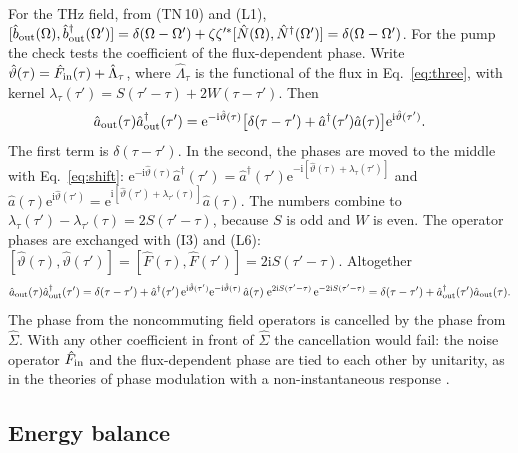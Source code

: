 \documentclass[aps,pra,onecolumn,notitlepage,11pt,amsmath,amssymb,nofootinbib]{revtex4-2}
\newcommand{\Nop}{\hat N}
\newcommand{\ee}{\mathrm{e}}
\newcommand{\ii}{\mathrm{i}}
\begin{document}
For the THz field, from (TN\,10) and (L1),
$[\hat b_{\rm out}(\Omega),\hat b_{\rm out}^\dagger(\Omega')]
=\delta(\Omega-\Omega')+\zeta\zeta'^*[\Nop(\Omega),\Nop^\dagger(\Omega')]
=\delta(\Omega-\Omega')$. For the pump the check tests the coefficient of the
flux-dependent phase. Write $\hat\vartheta(\tau)=\hat F_{\rm in}(\tau)+\hat\Lambda_\tau$,
where $\hat\Lambda_\tau$ is the functional of the flux in Eq.~\eqref{eq:three},
with kernel $\lambda_\tau(\tau')=S(\tau'-\tau)+2W(\tau-\tau')$. Then
\begin{equation}
\hat a_{\rm out}(\tau)\hat a_{\rm out}^\dagger(\tau')
=\ee^{-\ii\hat\vartheta(\tau)}\big[\delta(\tau-\tau')+\hat a^\dagger(\tau')\hat a(\tau)\big]\ee^{\ii\hat\vartheta(\tau')}.
\end{equation}
The first term is $\delta(\tau-\tau')$. In the second, the phases are moved to
the middle with Eq.~\eqref{eq:shift}:
$\ee^{-\ii\hat\vartheta(\tau)}\hat a^\dagger(\tau')
=\hat a^\dagger(\tau')\ee^{-\ii[\hat\vartheta(\tau)+\lambda_\tau(\tau')]}$ and
$\hat a(\tau)\ee^{\ii\hat\vartheta(\tau')}
=\ee^{\ii[\hat\vartheta(\tau')+\lambda_{\tau'}(\tau)]}\hat a(\tau)$. The numbers
combine to $\lambda_\tau(\tau')-\lambda_{\tau'}(\tau)=2S(\tau'-\tau)$, because
$S$ is odd and $W$ is even. The operator phases are exchanged with (I3) and
(L6): $[\hat\vartheta(\tau),\hat\vartheta(\tau')]=[\hat F(\tau),\hat F(\tau')]
=2\ii S(\tau'-\tau)$. Altogether
\begin{equation}
\hat a_{\rm out}(\tau)\hat a_{\rm out}^\dagger(\tau')
=\delta(\tau-\tau')+\hat a^\dagger(\tau')\,\ee^{\ii\hat\vartheta(\tau')}\ee^{-\ii\hat\vartheta(\tau)}\,\hat a(\tau)\;
\ee^{2\ii S(\tau'-\tau)}\,\ee^{-2\ii S(\tau'-\tau)}
=\delta(\tau-\tau')+\hat a_{\rm out}^\dagger(\tau')\hat a_{\rm out}(\tau).
\end{equation}
The phase from the noncommuting field operators is cancelled by the phase
from $\hat\Sigma$. With any other coefficient in front of $\hat\Sigma$ the
cancellation would fail: the noise operator $\hat F_{\rm in}$ and the
flux-dependent phase are tied to each other by unitarity, as in the theories
of phase modulation with a non-instantaneous response
\cite{boivin1994,shapirorazavi2007}.

\subsection{Energy balance}
\end{document}
